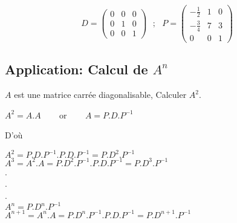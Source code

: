 \documentclass[a4paper,12pt,french]{article}
\begin{document}
	\[ D=\begin{pmatrix}
		0 & 0 & 0  \\
		0 & 1 & 0\\
		0 & 0 & 1
		
	\end{pmatrix} ~~~;~~~P=\begin{pmatrix}
		-\frac{1}{2} & 1 & 0  \\
		-\frac{3}{4} & 7 & 3\\
		0& 0 & 1
		
	\end{pmatrix}
	\]
	\subsection{Application: Calcul de $A^n$}
	$A$ est une matrice carrée diagonalisable, Calculer $A^2$.
	\begin{center}
		$A^2=A.A$ ~~~ or ~~~ $A=P.D.P^{-1}$\\
	\end{center}
	D'où 
	\begin{center}
		$A^{2}=P.D.P^{-1}.P.D.P^{-1}=P.D^2.P^{-1}$\\
		$A^{3}=A^{2}.A=P.D^{2}.P^{-1}.P.D.P^{-1}=P.D^3.P^{-1}$\\
		.\\
		.\\
		.\\
		$A^n=P.D^n.P^{-1}$\\
		$A^{n+1}=A^n.A=P.D^n.P^{-1}.P.D.P^{-1}=P.D^{n+1}.P^{-1}$ 
		
	\end{center}
	
	
	
	
	
\end{document}
